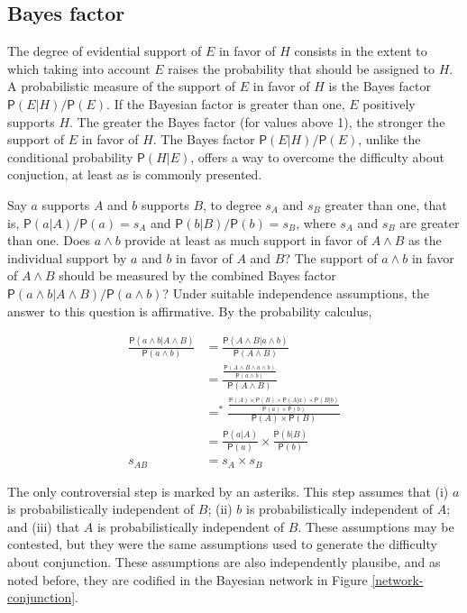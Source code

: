 \documentclass[10pt,dvipsnames,enabledeprecatedfontcommands]{scrartcl}
\newcommand{\et}{\wedge}
\newcommand{\pr}[1]{\mathsf{P}(#1)}
\begin{document}
\hypertarget{bayes-factor}{%
\subsection{Bayes factor}\label{bayes-factor}}

The degree of evidential support of \(E\) in favor of \(H\) consists in
the extent to which taking into account \(E\) raises the probability
that should be assigned to \(H\). A probabilistic measure of the support
of \(E\) in favor of \(H\) is the Bayes factor \(\pr{E | H}/\pr{E}\). If
the Bayesian factor is greater than one, \(E\) positively supports
\(H\). The greater the Bayes factor (for values above 1), the stronger
the support of \(E\) in favor of \(H\). The Bayes factor
\(\pr{E | H}/\pr{E}\), unlike the conditional probability
\(\pr{H | E}\), offers a way to overcome the difficulty about
conjuction, at least as is commonly presented.

Say \(a\) supports \(A\) and \(b\) supports \(B\), to degree \(s_A\) and
\(s_B\) greater than one, that is, \(\pr{a | A}/\pr{a}=s_A\) and
\(\pr{b | B}/\pr{b}=s_B\), where \(s_A\) and \(s_B\) are greater than
one. Does \(a \wedge b\) provide at least as much support in favor of
\(A \wedge B\) as the individual support by \(a\) and \(b\) in favor of
\(A\) and \(B\)? The support of \(a\et b\) in favor of \(A\et B\) should
be measured by the combined Bayes factor
\(\pr{a \wedge b| A\wedge B}/\pr{a \wedge b}\)? Under suitable
independence assumptions, the answer to this question is affirmative. By
the probability calculus,

\begin{align*}
\frac{\pr{a \wedge b| A\wedge B}}{\pr{a \wedge b}} & =  \frac{\pr{A \et B| a\wedge b}}{\pr{A \et B}}\\
& =  \frac{\frac{\pr{A \et B \et a \wedge b}}{\pr{a \et b}}}{\pr{A \et B}} \\ 
& =^*  \frac{\frac{\pr{A} \times \pr{B} \times \pr{A | a} \times \pr{B | b}}{\pr{a} \times \pr{b}}}{\pr{A} \times \pr{B}} \\ 
& =  \frac{\pr{a |A}}{\pr{a}} \times \frac{\pr{b |B}}{\pr{b}} \\
s_{AB}& =  s_{A}\times s_{B} 
 \end{align*}

\noindent The only controversial step is marked by an asteriks. This
step assumes that (i) \(a\) is probabilistically independent of \(B\);
(ii) \(b\) is probabilistically independent of \(A\); and (iii) that
\(A\) is probabilistically independent of \(B\). These assumptions may
be contested, but they were the same assumptions used to generate the
difficulty about conjunction. These assumptions are also independently
plausibe, and as noted before, they are codified in the Bayesian network
in Figure \ref{network-conjunction}.
\end{document}
